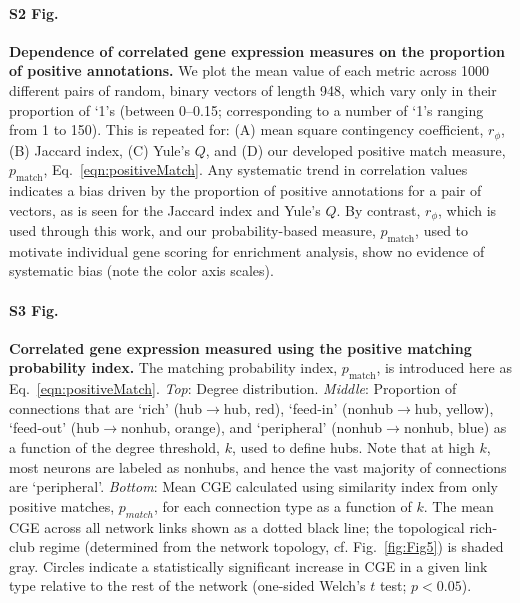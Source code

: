 \documentclass[10pt,letterpaper]{article}
\begin{document}
\paragraph*{S2 Fig.}
\label{S2_Fig}
{\bf Dependence of correlated gene expression measures on the proportion of positive annotations.} We plot the mean value of each metric across 1000 different pairs of random, binary vectors of length 948, which vary only in their proportion of `1's (between 0--0.15; corresponding to a number of `1's ranging from 1 to 150).
This is repeated for:
(A) mean square contingency coefficient, $r_\phi$,
(B) Jaccard index,
(C) Yule's $Q$, and
(D) our developed positive match measure, $p_\mathrm{match}$, Eq.~\eqref{eqn:positiveMatch}.
Any systematic trend in correlation values indicates a bias driven by the proportion of positive annotations for a pair of vectors, as is seen for the Jaccard index and Yule's $Q$.
By contrast, $r_\phi$, which is used through this work, and our probability-based measure, $p_\mathrm{match}$, used to motivate individual gene scoring for enrichment analysis, show no evidence of systematic bias (note the color axis scales).

\paragraph*{S3 Fig.}
\label{S3_Fig}
{\bf Correlated gene expression measured using the positive matching probability index.} The matching probability index, $p_\mathrm{match}$, is introduced here as Eq.~\eqref{eqn:positiveMatch}.
\emph{Top}: Degree distribution.
\emph{Middle}: Proportion of connections that are `rich' (hub$\rightarrow$hub, red), `feed-in' (nonhub$\rightarrow$hub, yellow), `feed-out' (hub$\rightarrow$nonhub, orange), and `peripheral' (nonhub$\rightarrow$nonhub, blue) as a function of the degree threshold, $k$, used to define hubs.
Note that at high $k$, most neurons are labeled as nonhubs, and hence the vast majority of connections are `peripheral'.
\emph{Bottom}: Mean CGE calculated using similarity index from only positive matches, $p_{match}$, for each connection type as a function of $k$.
The mean CGE across all network links shown as a dotted black line; the topological rich-club regime (determined from the network topology, cf. Fig.~\ref{fig:Fig5}) is shaded gray.
Circles indicate a statistically significant increase in CGE in a given link type relative to the rest of the network (one-sided Welch's $t$ test; $p < 0.05$).
\end{document}
